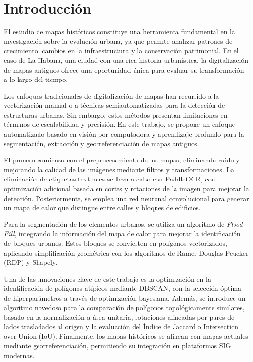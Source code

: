 \documentclass[twocolumn, fontsize=10pt]{article}
\begin{document}
\section{Introducción}
El estudio de mapas históricos constituye una herramienta fundamental en la investigación sobre la evolución urbana, ya que permite analizar patrones de crecimiento, cambios en la infraestructura y la conservación patrimonial. En el caso de La Habana, una ciudad con una rica historia urbanística, la digitalización de mapas antiguos ofrece una oportunidad única para evaluar su transformación a lo largo del tiempo.

Los enfoques tradicionales de digitalización de mapas han recurrido a la vectorización manual o a técnicas semiautomatizadas para la detección de estructuras urbanas. Sin embargo, estos métodos presentan limitaciones en términos de escalabilidad y precisión. En este trabajo, se propone un enfoque automatizado basado en visión por computadora y aprendizaje profundo para la segmentación, extracción y georreferenciación de mapas antiguos.

El proceso comienza con el preprocesamiento de los mapas, eliminando ruido y mejorando la calidad de las imágenes mediante filtros y transformaciones. La eliminación de etiquetas textuales se lleva a cabo con PaddleOCR, con optimización adicional basada en cortes y rotaciones de la imagen para mejorar la detección. Posteriormente, se emplea una red neuronal convolucional para generar un mapa de calor que distingue entre calles y bloques de edificios.

Para la segmentación de los elementos urbanos, se utiliza un algoritmo de \textit{Flood Fill}, integrando la información del mapa de calor para mejorar la identificación de bloques urbanos. Estos bloques se convierten en polígonos vectorizados, aplicando simplificación geométrica con los algoritmos de Ramer-Douglas-Peucker (RDP) y Shapely.

Una de las innovaciones clave de este trabajo es la optimización en la identificación de polígonos atípicos mediante DBSCAN, con la selección óptima de hiperparámetros a través de optimización bayesiana. Además, se introduce un algoritmo novedoso para la comparación de polígonos topológicamente similares, basado en la normalización a área unitaria, rotaciones alineadas por pares de lados trasladados al origen y la evaluación del Índice de Jaccard o Intersection over Union (IoU). Finalmente, los mapas históricos se alinean con mapas actuales mediante georreferenciación, permitiendo su integración en plataformas SIG modernas.
\end{document}
